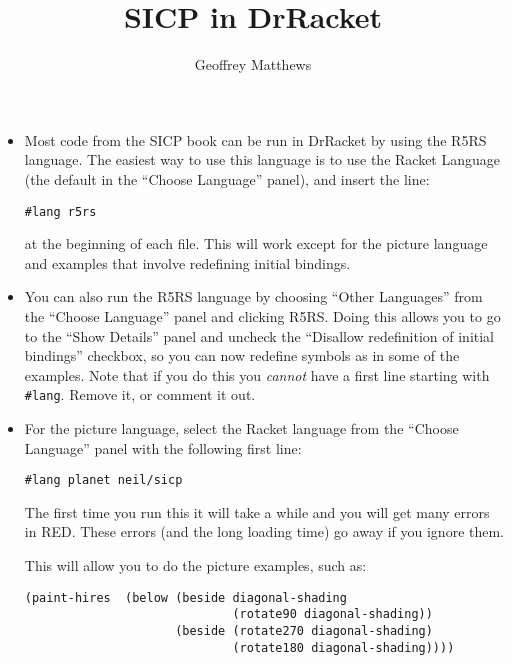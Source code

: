 \documentclass{article}
\title{SICP in DrRacket}
\author{Geoffrey Matthews}
\begin{document}
\maketitle

\begin{itemize}
\item
Most code from the SICP book can be run in DrRacket by using the R5RS
language.  The easiest way to use this language is to use the Racket
Language (the default in the ``Choose Language'' panel), and insert
the line:
\begin{verbatim}
#lang r5rs
\end{verbatim}
at the beginning of each file.  This will work except for the picture
language and examples that involve redefining initial bindings.

\item
You can also run the R5RS language by choosing ``Other Languages'' from
the ``Choose Language'' panel and clicking R5RS.  Doing this allows
you to go to the ``Show Details'' panel and uncheck the ``Disallow
redefinition of initial bindings'' checkbox, so you can now redefine
symbols as in some of the examples. Note that if you do this you
{\em cannot} have a first line starting with \verb|#lang|.  Remove it,
or comment it out.
\item
For the picture language, select the Racket language from the ``Choose
Language'' panel
with the following first line:
\begin{verbatim}
#lang planet neil/sicp
\end{verbatim}
The first time you
run this it will take a while and you will get many errors in RED.
These errors (and the long loading time) go away if you ignore them.

This will allow you to do the picture examples, such as:
\begin{verbatim}
(paint-hires  (below (beside diagonal-shading
                             (rotate90 diagonal-shading))
                     (beside (rotate270 diagonal-shading)
                             (rotate180 diagonal-shading))))
\end{verbatim}
\end{itemize}
\end{document}
